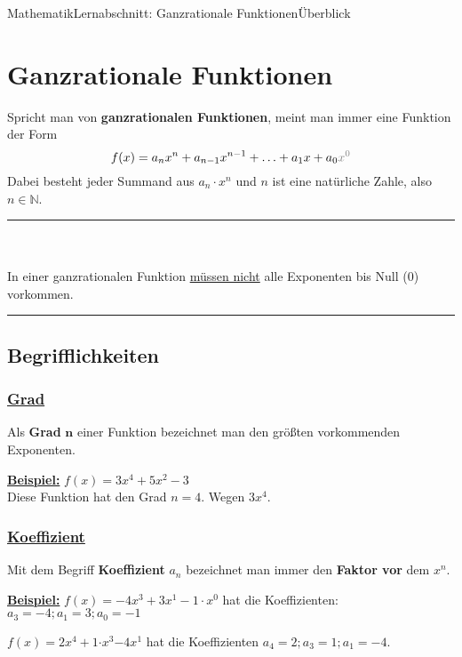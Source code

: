 \documentclass[11pt,twocolumn,oneside,openany,headings=optiontotoc,11pt,numbers=noenddot]{article}
\begin{document}
	\begin{worksheet}{Mathematik}{Lernabschnitt: Ganzrationale Funktionen}{Überblick}
		\setcounter{section}{5}
		\section{Ganzrationale Funktionen}
		Spricht man von \textbf{ganzrationalen Funktionen}, meint man immer eine Funktion der Form \[f(x) = a_nx^n + a_{n-1}x^{n-1} + \ldots + a_1x + a_0\color{codegray}{x^0}\] Dabei besteht jeder Summand aus \(a_n\cdot{}x^n\) und \(n\) ist eine natürliche Zahle, also \(n \in \mathbb{N}\).
		\par\noindent
		\rule{0.48\textwidth}{0.1pt}\\
		\underline{\color{red}{Vorsicht!}}\\
		In einer ganzrationalen Funktion \underline{müssen nicht} alle Exponenten bis Null (0) vorkommen.\\
		\rule{0.48\textwidth}{0.1pt}
		\subsection{Begrifflichkeiten}
		\subsubsection*{\underline{Grad}}
		Als \textbf{Grad} \(\mathbf{n}\) einer Funktion bezeichnet man den größten vorkommenden Exponenten.\\
		\par\noindent
		\textbf{\underline{Beispiel:}} \(f(x) = 3x^4 + 5x^2 -3\)\\
		Diese Funktion hat den Grad \(n = 4\). Wegen \(3x\)\colorbox{green!10}{\(^4\)}.
		\subsubsection*{\underline{Koeffizient}}
		Mit dem Begriff \textbf{Koeffizient} \(a_n\) bezeichnet man immer den \textbf{Faktor vor} dem \(x^n\).\\
		\par\noindent
		\underline{\textbf{Beispiel:}} \(f(x) = -4x^3 + 3x^{\mathit{1}} - 1\cdot{}\mathit{x^0}\) hat die Koeffizienten: \(a_3 = -4; a_1 = 3; a_0 = -1\)\\
		\par\noindent
		\(f(x) = \)\colorbox{green!10}{\(2\)}\(x^4 + \)\colorbox{green!10}{\(1\)}\(\cdot{}x^3 \)\colorbox{green!10}{\(- 4\)}\(x^{\mathit{1}}\) hat die Koeffizienten \(a_4 = 2; a_3 = 1; a_1 = -4\).

\end{worksheet}
\end{document}
